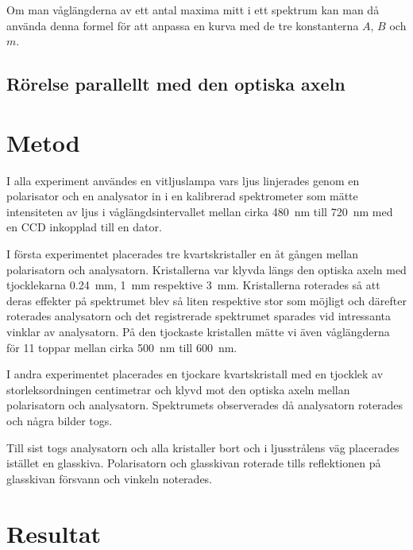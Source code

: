 \documentclass[a4paper]{article}
\begin{document}
Om man våglängderna av ett antal maxima mitt i ett spektrum kan man då använda denna formel för att anpassa en kurva med de tre konstanterna $A$, $B$ och $m$.

\subsection{Rörelse parallellt med den optiska axeln}

\section{Metod}
  
  I alla experiment användes en vitljuslampa vars ljus linjerades genom en polarisator och en analysator in i en kalibrerad spektrometer som mätte intensiteten av ljus i våglängdsintervallet mellan cirka \SI{480}{\nano\meter} till \SI{720}{\nano\meter} med en CCD inkopplad till en dator.
  
  I första experimentet placerades tre kvartskristaller en åt gången mellan polarisatorn och analysatorn. Kristallerna var klyvda längs den optiska axeln med tjocklekarna \SI{0.24}{\milli\meter}, \SI{1}{\milli\meter} respektive \SI{3}{\milli\meter}. Kristallerna roterades så att deras effekter på spektrumet blev så liten respektive stor som möjligt och därefter roterades analysatorn och det registrerade spektrumet sparades vid intressanta vinklar av analysatorn. På den tjockaste kristallen mätte vi även våglängderna för 11 toppar mellan cirka \SI{500}{\nano\meter} till \SI{600}{\nano\meter}.
  
  I andra experimentet placerades en tjockare kvartskristall med en tjocklek av storleksordningen centimetrar och klyvd mot den optiska axeln mellan polarisatorn och analysatorn. Spektrumets observerades då analysatorn roterades och några bilder togs.
  
  Till sist togs analysatorn och alla kristaller bort och i ljusstrålens väg placerades istället en glasskiva. Polarisatorn och glasskivan roterade tills reflektionen på glasskivan försvann och vinkeln noterades.

\section{Resultat}
\end{document}
